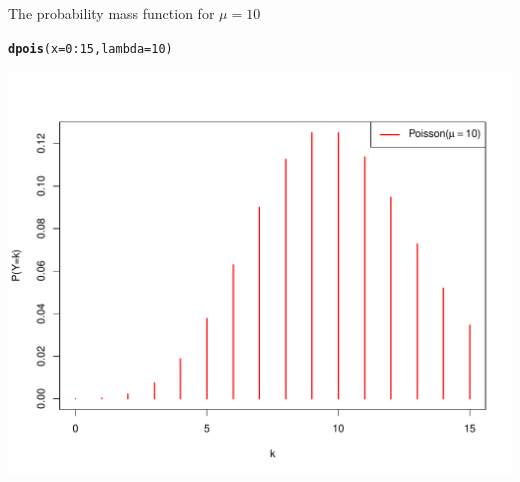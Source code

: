 \documentclass{beamer}\usepackage[]{graphicx}\usepackage[]{color}
\newcommand{\hlnum}[1]{\textcolor[rgb]{0.686,0.059,0.569}{#1}}%
\newcommand{\hlopt}[1]{\textcolor[rgb]{0,0,0}{#1}}%
\newcommand{\hlstd}[1]{\textcolor[rgb]{0.345,0.345,0.345}{#1}}%
\newcommand{\hlkwc}[1]{\textcolor[rgb]{0.333,0.667,0.333}{#1}}%
\newcommand{\hlkwd}[1]{\textcolor[rgb]{0.737,0.353,0.396}{\textbf{#1}}}%
\newenvironment{knitrout}{}{} %
\begin{document}
\begin{frame}[fragile]{The probability mass function for $\mu=10$}

\begin{knitrout}\scriptsize
{}\color{fgcolor}
\begin{alltt}
\hlkwd{dpois}\hlstd{(}\hlkwc{x} \hlstd{=} \hlnum{0}\hlopt{:}\hlnum{15}\hlstd{,} \hlkwc{lambda} \hlstd{=} \hlnum{10}\hlstd{)}
\end{alltt}

\end{knitrout}

\vspace*{-0.5in}

\begin{knitrout}\scriptsize
{}\color{fgcolor}

{\centering \includegraphics[width=1\linewidth]{figure/unnamed-chunk-5-1} 

}



\end{knitrout}

\end{frame}
\end{document}
